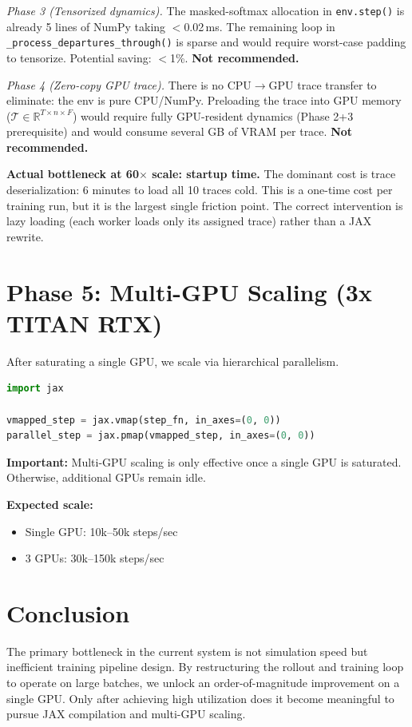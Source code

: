 \documentclass[11pt]{article}
\begin{document}
\textit{Phase 3 (Tensorized dynamics).}
The masked-softmax allocation in \texttt{env.step()} is already 5 lines
of NumPy taking $<$0.02\,ms.  The remaining loop in
\texttt{\_process\_departures\_through()} is sparse and would require
worst-case padding to tensorize.  Potential saving: $<$1\%.
\textbf{Not recommended.}

\textit{Phase 4 (Zero-copy GPU trace).}
There is no CPU$\to$GPU trace transfer to eliminate: the env is pure CPU/NumPy.
Preloading the trace into GPU memory ($\mathcal{T} \in \mathbb{R}^{T \times n \times F}$)
would require fully GPU-resident dynamics (Phase 2+3 prerequisite) and would
consume several GB of VRAM per trace.
\textbf{Not recommended.}

\textbf{Actual bottleneck at 60$\times$ scale: startup time.}
The dominant cost is trace deserialization: 6 minutes to load all 10 traces
cold.  This is a one-time cost per training run, but it is the largest
single friction point.  The correct intervention is lazy loading (each
worker loads only its assigned trace) rather than a JAX rewrite.

\section{Phase 5: Multi-GPU Scaling (3x TITAN RTX)}

After saturating a single GPU, we scale via hierarchical parallelism.

\begin{lstlisting}[language=Python, caption=Hierarchical Parallelization]
import jax

vmapped_step = jax.vmap(step_fn, in_axes=(0, 0))
parallel_step = jax.pmap(vmapped_step, in_axes=(0, 0))
\end{lstlisting}

\textbf{Important:} Multi-GPU scaling is only effective once a single GPU is
saturated. Otherwise, additional GPUs remain idle.

\textbf{Expected scale:}
\begin{itemize}
    \item Single GPU: 10k--50k steps/sec
    \item 3 GPUs: 30k--150k steps/sec
\end{itemize}

\section{Conclusion}

The primary bottleneck in the current system is not simulation speed but
inefficient training pipeline design. By restructuring the rollout and
training loop to operate on large batches, we unlock an order-of-magnitude
improvement on a single GPU. Only after achieving high utilization does it
become meaningful to pursue JAX compilation and multi-GPU scaling.
\end{document}
